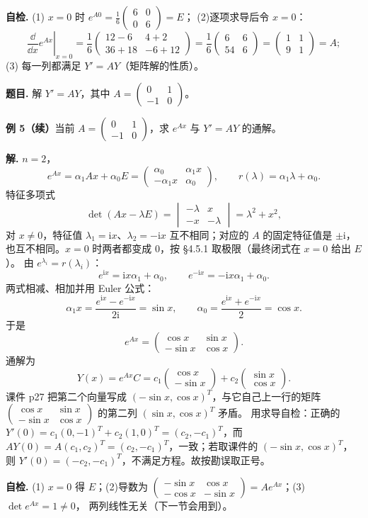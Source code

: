 \documentclass[11pt]{ctexart}
\newcommand{\pmat}[1]{\begin{pmatrix}#1\end{pmatrix}}
\newcommand{\ii}{\mathrm{i}}
\newcommand{\Ax}{Ax}
\begin{document}
\textbf{自检.} (1) $x=0$ 时 $e^{A0}=\frac16\pmat{6&0\\0&6}=E$；
(2)逐项求导后令 $x=0$：
\[
\left.\frac{\dd}{\dd x}e^{Ax}\right|_{x=0}
=\frac16\pmat{12-6&4+2\\36+18&-6+12}
=\frac16\pmat{6&6\\54&6}
=\pmat{1&1\\9&1}=A;
\]
(3) 每一列都满足 $Y'=AY$（矩阵解的性质）。


\textbf{题目.} 解 $Y'=AY$，其中 $A=\pmat{0&1\\-1&0}$。

\clearpage
\noindent\textbf{例 5（续）}\quad 当前 $A=\pmat{0&1\\-1&0}$，求 $e^{Ax}$ 与 $Y'=AY$ 的通解。

\textbf{解.} $n=2$，
\[
e^{Ax}=\alpha_1\Ax+\alpha_0E
=\pmat{\alpha_0&\alpha_1x\\-\alpha_1x&\alpha_0},\qquad
r(\lambda)=\alpha_1\lambda+\alpha_0 .
\]
特征多项式
\[
\det(\Ax-\lambda E)=\begin{vmatrix}-\lambda&x\\-x&-\lambda\end{vmatrix}=\lambda^2+x^2,
\]
对 $x\ne0$，特征值 $\lambda_1=\ii x$、$\lambda_2=-\ii x$ 互不相同；对应的 $A$ 的固定特征值是
$\pm\ii$，也互不相同。$x=0$ 时两者都变成 $0$，按 §4.5.1 取极限（最终闭式在 $x=0$ 给出 $E$）。
由 $e^{\lambda_i}=r(\lambda_i)$：
\[
e^{\ii x}=\ii x\alpha_1+\alpha_0,\qquad
e^{-\ii x}=-\ii x\alpha_1+\alpha_0 .
\]
两式相减、相加并用 Euler 公式：
\[
\alpha_1x=\frac{e^{\ii x}-e^{-\ii x}}{2\ii}=\sin x,\qquad
\alpha_0=\frac{e^{\ii x}+e^{-\ii x}}{2}=\cos x .
\]
于是
\[
e^{Ax}=\pmat{\cos x&\sin x\\-\sin x&\cos x}.
\]
通解为
\[
Y(x)=e^{Ax}C
=c_1\pmat{\cos x\\-\sin x}+c_2\pmat{\sin x\\\cos x}.
\]
课件 p27 把第二个向量写成 $(-\sin x,\cos x)^T$，与它自己上一行的矩阵
$\pmat{\cos x&\sin x\\-\sin x&\cos x}$ 的第二列 $( \sin x,\cos x)^T$ 矛盾。
用求导自检：正确的 $Y'(0)=c_1(0,-1)^T+c_2(1,0)^T=(c_2,-c_1)^T$，而
$AY(0)=A(c_1,c_2)^T=(c_2,-c_1)^T$，一致；若取课件的 $(-\sin x,\cos x)^T$，则
$Y'(0)=(-c_2,-c_1)^T$，不满足方程。故按勘误取正号。

\textbf{自检.} (1) $x=0$ 得 $E$；(2)导数为
$\pmat{-\sin x&\cos x\\-\cos x&-\sin x}=Ae^{Ax}$；(3) $\det e^{Ax}=1\ne0$，
两列线性无关（下一节会用到）。
\end{document}
